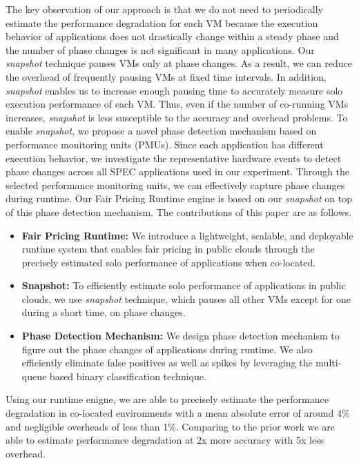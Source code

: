 \documentclass{sig-alternate}
\begin{document}
The key observation of our approach is that we do not need to periodically estimate the performance degradation for each VM because the execution behavior of applications does not drastically change within a steady phase and the number of phase changes is not significant in many applications. Our \textit{snapshot} technique pauses VMs only at phase changes. As a result, we can reduce the overhead of frequently pausing VMs at fixed time intervals. In addition, \textit{snapshot} enables us to increase enough pausing time to accurately measure solo execution performance of each VM. Thus, even if the number of co-running VMs increases, \textit{snapshot} is less susceptible to the accuracy and overhead problems. To enable \textit{snapshot}, we propose a novel phase detection mechanism based on performance monitoring units (PMUs). Since each application has different execution behavior, we investigate the representative hardware events to detect phase changes across all SPEC applications used in our experiment. Through the selected performance monitoring units, we can effectively capture phase changes during runtime. Our Fair Pricing Runtime engine is based on our \textit{snapshot} on top of this phase detection mechanism. The contributions of this paper are as follows.

\begin{itemize}
\item \textbf{Fair Pricing Runtime:} We introduce a lightweight, scalable, and deployable runtime system that enables fair pricing in public clouds through the precisely estimated solo performance of applications when co-located. 

\item \textbf{Snapshot:} To efficiently estimate solo performance of applications in public clouds, we use \textit{snapshot} technique, which pauses all other VMs except for one during a short time, on phase changes.

\item \textbf{Phase Detection Mechanism:} We design phase detection mechanism to figure out the phase changes of applications during runtime. We also efficiently eliminate false positives as well as spikes by leveraging the multi-queue based binary classification technique.

\end{itemize}

Using our runtime enigne, we are able to precisely estimate the performance degradation in co-located environments with a mean absolute error of around 4\% and negligible overheads of less than 1\%. Comparing to the prior work we are able to estimate performance degradation at 2x more accuracy with 5x less overhead.
\end{document}
